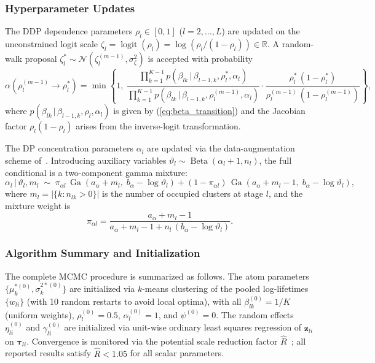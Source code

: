 \documentclass[a4paper,fleqn,longmktitle]{cas-sc}
\DeclareMathOperator{\Ga}{Ga}
\DeclareMathOperator{\Be}{Beta}
\DeclareMathOperator{\logit}{logit}
\newcommand{\given}{\,|\,}
\newcommand{\normal}{\mathcal{N}}
\newcommand{\R}{\mathbb{R}}
\begin{document}
\subsubsection{Hyperparameter Updates}

The DDP dependence parameters $\rho_l \in [0,1]$ ($l = 2, \ldots, L$) are updated on the unconstrained logit scale $\zeta_l = \logit(\rho_l) = \log(\rho_l/(1-\rho_l)) \in \R$. A random-walk proposal $\zeta_l^* \sim \normal(\zeta_l^{(m-1)}, \sigma_{\zeta}^2)$ is accepted with probability~\cite{Roberts1997}
\begin{equation}\label{eq:rho_mh}
    \alpha(\rho_l^{(m-1)} \to \rho_l^*) = \min\!\left\{1, \;
        \frac{
            \prod_{k=1}^{K-1}
            p(\beta_{lk} \given \beta_{l-1,k}, \rho_l^*, \alpha_l)
        }{
            \prod_{k=1}^{K-1}
            p(\beta_{lk} \given \beta_{l-1,k}, \rho_l^{(m-1)}, \alpha_l)
        }
        \cdot
        \frac{\rho_l^*\,(1 - \rho_l^*)}{\rho_l^{(m-1)}\,(1 - \rho_l^{(m-1)})}
    \right\},
\end{equation}
where $p(\beta_{lk} \given \beta_{l-1,k}, \rho_l, \alpha_l)$ is given by (\ref{eq:beta_transition}) and the Jacobian factor $\rho_l(1-\rho_l)$ arises from the inverse-logit transformation.

The DP concentration parameters $\alpha_l$ are updated via the data-augmentation scheme of~\cite{Escobar1995}. Introducing auxiliary variables $\vartheta_l \sim \Be(\alpha_l + 1, n_l)$, the full conditional is a two-component gamma mixture:
\begin{equation}\label{eq:alpha_update}
    \alpha_l \given \vartheta_l, m_l \;\sim\;
    \pi_{\alpha l}\,\Ga(a_\alpha + m_l, \; b_\alpha - \log\vartheta_l)
    + (1 - \pi_{\alpha l})\,\Ga(a_\alpha + m_l - 1, \; b_\alpha - \log\vartheta_l),
\end{equation}
where $m_l = |\{k : n_{lk} > 0\}|$ is the number of occupied clusters at stage $l$, and the mixture weight is
\begin{equation}\label{eq:alpha_weight}
    \pi_{\alpha l} = \frac{a_\alpha + m_l - 1}
                          {a_\alpha + m_l - 1 + n_l\,(b_\alpha - \log\vartheta_l)}.
\end{equation}

\subsubsection{Algorithm Summary and Initialization}

The complete MCMC procedure is summarized as follows. The atom parameters $\{\mu_k^{*(0)}, \sigma_k^{2*(0)}\}$ are initialized via $k$-means clustering of the pooled log-lifetimes $\{w_{li}\}$ (with 10 random restarts to avoid local optima), with all $\beta_{lk}^{(0)} = 1/K$ (uniform weights), $\rho_l^{(0)} = 0.5$, $\alpha_l^{(0)} = 1$, and $\psi^{(0)} = 0$. The random effects $\eta_{li}^{(0)}$ and $\gamma_{li}^{(0)}$ are initialized via unit-wise ordinary least squares regression of $\bm{z}_{li}$ on $\bm{\tau}_{li}$. Convergence is monitored via the potential scale reduction factor $\widehat{R}$~\cite{Gelman1992}; all reported results satisfy $\widehat{R} < 1.05$ for all scalar parameters.
\end{document}
